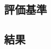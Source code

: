 \documentclass[a4j,11pt]{jarticle}
\def\proposed{DNRBA}
\begin{document}



\subsection{評価基準}
\label{ss:eval_criteria}



\subsection{結果}
\label{ss:results}


\FloatBarrier



\FloatBarrier
\end{document}
